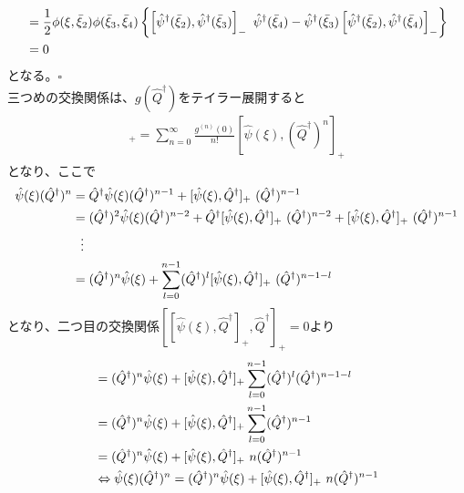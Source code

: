 \documentclass[dvipdfmx, 11pt, a4paper]{jsarticle}
\numberwithin{equation}{section}
\theoremstyle{definition}
\begin{document}
\begin{derivationBox}
\begin{align}
            &=\frac{1}{2}\phi(\xi,\bar{\xi}_2) \phi(\bar{\xi}_3,\bar{\xi}_4) \left\{ \left[  \hat{\psi}^\dagger(\bar{\xi}_2), \hat{\psi}^\dagger(\bar{\xi}_3)\right]_{-}\ \hat{\psi}^\dagger(\bar{\xi}_4) - \hat{\psi}^\dagger(\bar{\xi}_3)\left[  \hat{\psi}^\dagger(\bar{\xi}_2), \hat{\psi}^\dagger(\bar{\xi}_4)\right]_{-} \right\} \notag \\
            &= 0
        \end{align}
        となる。$\square$\\
        三つめの交換関係は、$g(\hat{Q}^\dagger)$をテイラー展開すると
        \begin{align}
            [\hat{\psi}(\xi),g(\hat{Q}^\dagger)]_{+} = \sum_{n=0}^\infty \frac{g^{(n)}(0)}{n!}[\hat{\psi}(\xi),(\hat{Q}^\dagger)^n]_{+}
        \end{align}
        となり、ここで
        \begin{align}
            \hat{\psi}(\xi)(\hat{Q}^\dagger)^n &= \hat{Q}^\dagger \hat{\psi}(\xi) (\hat{Q}^\dagger)^{n-1} + [\hat{\psi}(\xi),\hat{Q}^\dagger]_{+}\ (\hat{Q}^\dagger)^{n-1} \notag \\
            &= (\hat{Q}^\dagger)^2 \hat{\psi}(\xi) (\hat{Q}^\dagger)^{n-2} + \hat{Q}^\dagger [\hat{\psi}(\xi),\hat{Q}^\dagger]_{+}\ (\hat{Q}^\dagger)^{n-2}  + [\hat{\psi}(\xi),\hat{Q}^\dagger]_{+}\ (\hat{Q}^\dagger)^{n-1} \notag \\
            &\ \ \vdots \notag \\
            &= (\hat{Q}^\dagger)^n \hat{\psi}(\xi)+ \sum_{l=0}^{n-1} (\hat{Q}^\dagger)^l [\hat{\psi}(\xi),\hat{Q}^\dagger]_{+}\ (\hat{Q}^\dagger)^{n-1-l}
        \end{align}
        となり、二つ目の交換関係$\left[ [\hat{\psi}(\xi),\hat{Q}^\dagger]_{+}, \hat{Q}^\dagger\right]_{+} = 0$より
        \begin{align}
            &= (\hat{Q}^\dagger)^n \hat{\psi}(\xi)+ [\hat{\psi}(\xi),\hat{Q}^\dagger]_{+} \sum_{l=0}^{n-1} (\hat{Q}^\dagger)^l (\hat{Q}^\dagger)^{n-1-l} \notag \\
            &= (\hat{Q}^\dagger)^n \hat{\psi}(\xi)+ [\hat{\psi}(\xi),\hat{Q}^\dagger]_{+} \sum_{l=0}^{n-1} (\hat{Q}^\dagger)^{n-1}\notag \\
            &= (\hat{Q}^\dagger)^n \hat{\psi}(\xi)+ [\hat{\psi}(\xi),\hat{Q}^\dagger]_{+}\ n (\hat{Q}^\dagger)^{n-1}\notag \\
            &\Leftrightarrow \hat{\psi}(\xi)(\hat{Q}^\dagger)^n = (\hat{Q}^\dagger)^n \hat{\psi}(\xi)+ [\hat{\psi}(\xi),\hat{Q}^\dagger]_{+}\ n (\hat{Q}^\dagger)^{n-1}\notag \\

\end{align}
\end{derivationBox}
\end{document}
